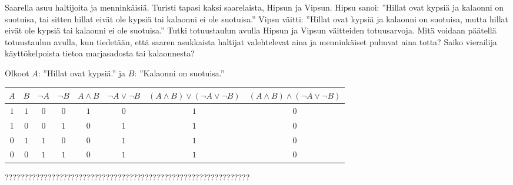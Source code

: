 \begin{tehtava}
    Saarella asuu haltijoita ja menninkäisiä. Turisti tapasi kaksi saarelaista, Hipsun ja Vipsun. Hipsu sanoi: ''Hillat ovat kypsiä ja kalaonni on suotuisa, tai sitten hillat eivät ole kypsiä tai kalaonni ei ole suotuisa.'' Vipsu väitti: ''Hillat ovat kypsiä ja kalaonni on suotuisa, mutta hillat eivät ole kypsiä tai kalaonni ei ole suotuisa.'' Tutki totuustaulun avulla Hipsun ja Vipsun väitteiden totuusarvoja. Mitä voidaan päätellä totuustaulun avulla, kun tiedetään, että saaren asukkaista haltijat valehtelevat aina ja menninkäiset puhuvat aina totta? Saiko vierailija käyttökelpoista tietoa marjasadosta tai kalaonnesta?

    \begin{vastaus}
    Olkoot $A$: ''Hillat ovat kypsiä.'' ja $B$: ''Kalaonni on suotuisa.''
    \begin{center}
		    \begin{tabular}{|c|c|c|c|c|c|c|c|}\hline
		    $A$ & $B$ & $\lnot A$ & $\lnot B$ & $A\land B$ & 
		         $\lnot A\lor \lnot B$ & $(A \land B)\lor(\lnot A\lor \lnot B)$ & $(A\land B)\land(\lnot A\lor \lnot B)$ \\ \hline
		    $1$ & $1$ & $0$ & $0$ & $1$ & $0$ & $1$ & $0$  \\ %
		    $1$ & $0$ & $0$ & $1$ & $0$ & $1$ & $1$ & $0$  \\
		    $0$ & $1$ & $1$ & $0$ & $0$ & $1$ & $1$ & $0$  \\
		    $0$ & $0$ & $1$ & $1$ & $0$ & $1$ & $1$ & $0$  \\ \hline
\end{tabular}
\end{center}
	??????????????????????????????????????????????????????????????? %
    \end{vastaus}
    
\end{tehtava}

